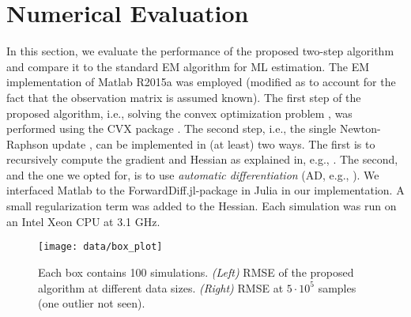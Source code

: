 \documentclass[journal]{IEEEtran}
\begin{document}
\section{Numerical Evaluation}
\label{sec:numerical_results}

In this section, we evaluate the performance of the proposed two-step algorithm and
compare it to the standard EM algorithm for ML estimation. The EM implementation of Matlab
R2015a was employed (modified as to account for the fact that the observation matrix is
assumed known). The first step of the proposed algorithm, i.e., solving the convex
optimization problem , was performed using the CVX package
\cite{grant_cvx_2014}. The second step, i.e., the single Newton-Raphson update
, can be implemented in (at least) two ways. The first is to
recursively compute the gradient and Hessian as explained in, e.g.,
\cite{lystig_exact_2002, cappe_recursive_2005, cappe_inference_2005, turner_direct_2008,
khreich_survey_2012, macdonald_numerical_2014}. The second, and the one we opted for, is
to use \emph{automatic differentiation} (AD, e.g., \cite{griewank_evaluating_2008}). We
interfaced Matlab to the ForwardDiff.jl-package in Julia \cite{revels_forward-mode_2016}
in our implementation. A small regularization term was added to the Hessian. Each
simulation was run on an Intel Xeon CPU at 3.1 GHz.


\begin{figure}[b!]
\centering
\texttt{[image: data/box\_plot]}
\caption{Each box contains 100 simulations. \emph{(Left)} RMSE of the proposed algorithm
at different data sizes. \emph{(Right)} RMSE at $5\!\cdot\!10^5$ samples (one outlier not
seen).}
  \label{fig:box_plots}
\end{figure}
\end{document}
